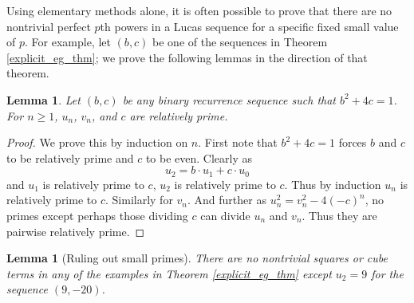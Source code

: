 \documentclass[12pt]{amsart}
\newtheorem{lem}[thm]{Lemma}
\theoremstyle{definition}
\begin{document}
Using elementary methods alone, it is often possible to prove that there are no nontrivial perfect $p$th powers in a Lucas sequence for a specific fixed small value of $p$.  For example, let $(b,c)$ be one of the sequences in Theorem \ref{explicit_eg_thm}; we prove the following lemmas in the direction of that theorem.

\begin{lem}\label{relprime}
Let $(b,c)$ be any binary recurrence sequence such that $b^2+4c=1$.  For $n \geq 1$,  $u_n$, $v_n$, and $c$ are relatively prime.
\end{lem}

\begin{proof}
We prove this by induction on $n$.  First note that $b^2 +4c = 1$ forces $b$ and $c$ to be relatively prime and $c$ to be even.  Clearly as
\[ u_2 = b \cdot u_1 + c \cdot u_0 \]
and $u_1$ is relatively prime to $c$, $u_2$ is relatively prime to $c$.  Thus by induction $u_n$ is relatively prime to $c$.  Similarly for $v_n$.  And further as $u_n^2  = v_n^2 - 4(-c)^n$, no primes except perhaps those dividing $c$ can divide $u_n$ and $v_n$.  Thus they are pairwise relatively prime.
\end{proof}

\begin{lem}[Ruling out small primes]\label{smallp}
There are no nontrivial squares or cube terms in any of the examples in Theorem \ref{explicit_eg_thm} except $u_2 = 9$ for the sequence $(9,-20)$.
\end{lem}
\end{document}
